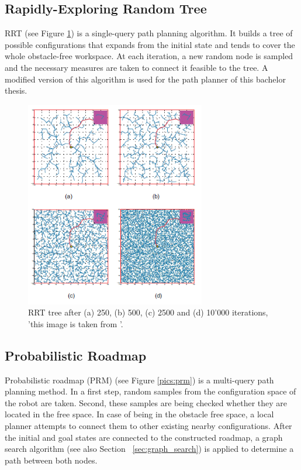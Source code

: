 \subsection{Rapidly-Exploring Random Tree}

RRT (see Figure \ref{pics:rrt}) is a single-query path planning algorithm. It builds a tree of possible configurations that expands from the initial state and tends to cover the whole obstacle-free workspace. At each iteration, a new random node is sampled and the necessary measures are taken to connect it feasible to the tree. A modified version of this algorithm is used for the path planner of this bachelor thesis.

\begin{figure} [h]
	\centering
	\includegraphics[width=0.7\textwidth]{images/rrt.png}
	\caption{RRT tree after (a) 250, (b) 500, (c) 2500 and (d) 10'000 iterations, 'this image is taken from \cite{Karaman2011}'.}
	\label{pics:rrt}
\end{figure} 

\subsection{Probabilistic Roadmap}

Probabilistic roadmap (PRM) (see Figure \ref{pics:prm}) is a multi-query path planning method. In a first step, random samples from the configuration space of the robot are taken. Second, these samples are being checked whether they are located in the free space. In case of being in the obstacle free space, a local planner attempts to connect them to other existing nearby configurations. After the initial and goal states are connected to the constructed roadmap, a graph search algorithm (see also Section ~\ref{sec:graph_search})  is applied to determine a path between both nodes.  

